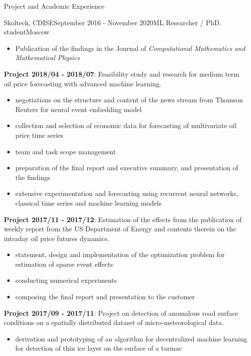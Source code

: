 \documentclass{resume} %
\begin{document}
\begin{rSection}{Project and Academic Experience}
\begin{rSubsection}{Skoltech, CDISE}{September 2016 - November 2020}{ML Researcher / PhD. student}{Moscow}
\begin{itemize}
        \item Publication of the findings in the Journal of \emph{Computational Mathematics
        and Mathematical Physics}
    \end{itemize}

    \medskip
    \item \textbf{Project 2018/04 - 2018/07}:
    Feasibility study and research for medium term oil price forecasting with advanced machine
    learning. \begin{itemize}
        \item negotiations on the structure and content of the news stream from Thomson Reuters
        for neural event embedding model
        
        \item collection and selection of economic data for forecasting of multivariate oil
        price time series
        
        \item team and task scope management
        
        \item preparation of the final report and executive summary, and presentation
        of the findings
        
        \item extensive experimentation and forecasting using recurrent neural networks, classical
        time series and machine learning models
    \end{itemize}

    \medskip
    \item \textbf{Project 2017/11 - 2017/12}:
    Estimation of the effects from the publication of weekly report from the US Department
    of Energy and contents therein on the intraday oil price futures dynamics.
    \begin{itemize}
        \item statement, design and implementation of the optimization problem for
        estimation of sparse event effects
        
        \item conducting numerical experiments
        
        \item composing the final report and presentation to the customer
    \end{itemize}

    \medskip
    \item \textbf{Project 2017/09 - 2017/11}:
    Project on detection of anomalous road surface conditions on a spatially distributed
    dataset of micro-meteorological data. \begin{itemize}
        \item derivation and prototyping of an algorithm for decentralized machine
        learning for detection of thin ice layer on the surface of a tarmac
        

\end{itemize}
\end{rSubsection}
\end{rSection}
\end{document}
